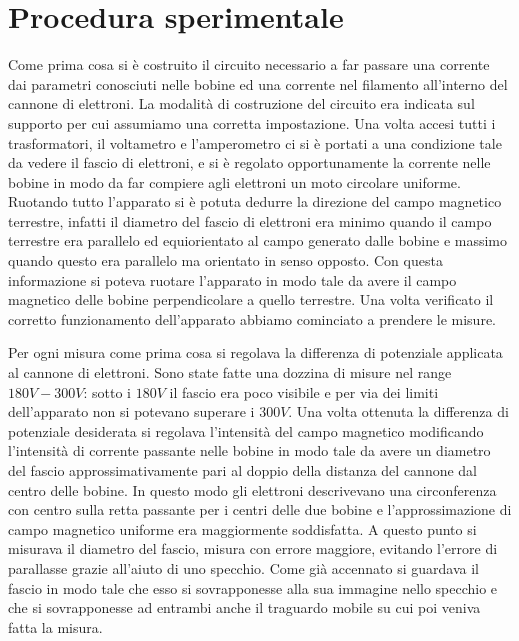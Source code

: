 \documentclass[a4paper,11pt]{article}
\begin{document}
		
		\section{Procedura sperimentale}
		
		Come prima cosa si è costruito il circuito necessario a far passare una corrente dai parametri conosciuti nelle bobine ed una corrente nel filamento all'interno del cannone di elettroni. La modalità di costruzione del circuito era indicata sul supporto per cui assumiamo una corretta impostazione. Una volta accesi tutti i trasformatori, il voltametro e l'amperometro ci si è portati a una condizione tale da vedere il fascio di elettroni, e si è regolato opportunamente la corrente nelle bobine in modo da far compiere agli elettroni un moto circolare uniforme. Ruotando tutto l'apparato si è potuta dedurre la direzione del campo magnetico terrestre, infatti il diametro del fascio di elettroni era minimo quando il campo terrestre era parallelo ed equiorientato al campo generato dalle bobine e massimo quando questo era parallelo ma orientato in senso opposto. Con questa informazione si poteva ruotare l'apparato in modo tale da avere il campo magnetico delle bobine perpendicolare a quello terrestre. Una volta verificato il corretto funzionamento dell'apparato abbiamo cominciato a prendere le misure.
		
		Per ogni misura come prima cosa si regolava la differenza di potenziale applicata al cannone di elettroni. Sono state fatte una dozzina di misure nel range $180 V - 300 V$: sotto i $180 V$ il fascio era poco visibile e per via dei limiti dell'apparato non si potevano superare i $300 V$. Una volta ottenuta la differenza di potenziale desiderata si regolava l'intensità del campo magnetico modificando l'intensità di corrente passante nelle bobine in modo tale da avere un diametro del fascio approssimativamente pari al doppio della distanza del cannone dal centro delle bobine. In questo modo gli elettroni descrivevano una circonferenza con centro sulla retta passante per i centri delle due bobine e l'approssimazione di campo magnetico uniforme era maggiormente soddisfatta. A questo punto si misurava il diametro del fascio, misura con errore maggiore, evitando l'errore di parallasse grazie all'aiuto di uno specchio. Come già accennato si guardava il fascio in modo tale che esso si sovrapponesse alla sua immagine nello specchio e che si sovrapponesse ad entrambi anche il traguardo mobile su cui poi veniva fatta la misura.
		
\end{document}
